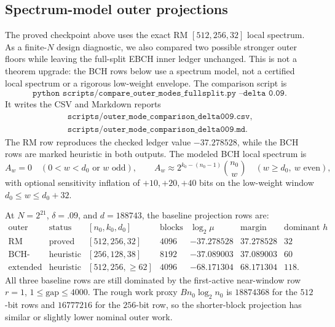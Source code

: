 \subsection{Spectrum-model outer projections}
\label{subsec:fullsplit-outer-spectrum-projections}

The proved checkpoint above uses the exact RM \([512,256,32]\) local spectrum.  As a finite-\(N\) design diagnostic, we
also compared two possible stronger outer floors while leaving the full-split EBCH inner ledger unchanged.  This is not
a theorem upgrade: the BCH rows below use a spectrum model, not a certified local spectrum or a rigorous low-weight
envelope.  The comparison script is
\[
\texttt{python scripts/compare\_outer\_modes\_fullsplit.py --delta 0.09}.
\]
It writes the CSV and Markdown reports
\[
\begin{gathered}
\texttt{scripts/outer\_mode\_comparison\_delta009.csv},\\
\texttt{scripts/outer\_mode\_comparison\_delta009.md}.
\end{gathered}
\]
The RM row reproduces the checked ledger value
\(-37.278528\), while the BCH rows are marked heuristic in both outputs.  The modeled BCH local spectrum is
\[
A_w=0\quad(0<w<d_0\text{ or }w\text{ odd}),\qquad
A_w\approx 2^{k_0-(n_0-1)}\binom{n_0}{w}\quad(w\ge d_0,\ w\text{ even}),
\]
with optional sensitivity inflation of \(+10,+20,+40\) bits on the low-weight window
\(d_0\le w\le d_0+32\).

At \(N=2^{21}\), \(\delta=.09\), and \(d=188743\), the baseline projection rows are:
\[
\begin{array}{c|c|c|c|c|c|c}
\text{outer mode} & \text{status} & [n_0,k_0,d_0] & \text{blocks} &
\log_2\mu & \text{margin bits} & \text{dominant }h\\
\hline
\text{RM exact} & \text{proved} & [512,256,32] & 4096 & -37.278528 & 37.278528 & 32\\
\text{BCH-like} & \text{heuristic} & [256,128,38] & 8192 & -37.089003 & 37.089003 & 60\\
\text{extended BCH-like} & \text{heuristic} & [512,256,\ge62] & 4096 & -68.171304 & 68.171304 & 118 .
\end{array}
\]
All three baseline rows are still dominated by the first-active near-window row \(r=1\), \(1\le\mathrm{gap}\le4000\).
The rough work proxy \(B n_0\log_2 n_0\) is \(18874368\) for the \(512\)-bit rows and \(16777216\) for the \(256\)-bit
row, so the shorter-block projection has similar or slightly lower nominal outer work.

